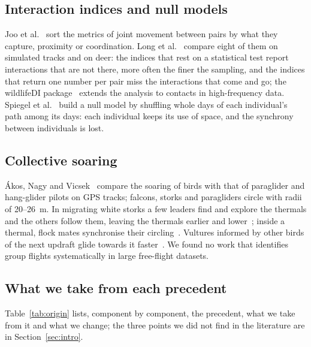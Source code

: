 \subsection{Interaction indices and null models}

Joo et al.~\cite{joo2018} sort the metrics of joint movement between pairs by what they capture,
proximity or coordination. Long et al.~\cite{long2014} compare eight of them on simulated tracks
and on deer: the indices that rest on a statistical test report interactions that are not there,
more often the finer the sampling, and the indices that return one number per pair miss the
interactions that come and go; the wildlifeDI package~\cite{long2022} extends the analysis to
contacts in high-frequency data. Spiegel et al.~\cite{spiegel2016} build a null model by shuffling
whole days of each individual's path among its days: each individual keeps its use of space, and
the synchrony between individuals is lost.

\subsection{Collective soaring}

Ákos, Nagy and Vicsek~\cite{akos2008} compare the soaring of birds with that of paraglider and
hang-glider pilots on GPS tracks; falcons, storks and paragliders circle with radii of 20--26~m.
In migrating white storks a few leaders find and explore the thermals and the others follow them,
leaving the thermals earlier and lower~\cite{flack2018}; inside a thermal, flock mates
synchronise their circling~\cite{nagy2018}. Vultures informed by other birds of the next updraft
glide towards it faster~\cite{williams2018}. We found no work that identifies group flights
systematically in large free-flight datasets.

\subsection{What we take from each precedent}

Table~\ref{tab:origin} lists, component by component, the precedent, what we take from it and
what we change; the three points we did not find in the literature are in
Section~\ref{sec:intro}.

